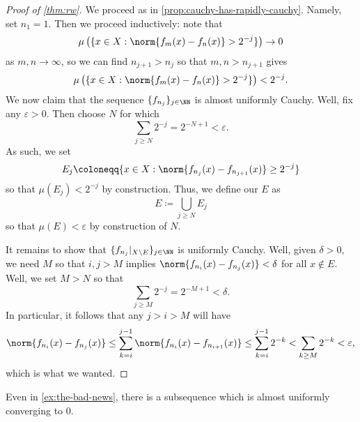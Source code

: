 \documentclass[../notes.tex]{subfiles}
\begin{document}
\begin{proof}[Proof of \autoref{thm:rw}]
	We proceed as in \autoref{prop:cauchy-has-rapidly-cauchy}. Namely, set $n_1=1$. Then we proceed inductively: note that
	\[\mu\left(\{x\in X:\norm{f_m(x)-f_n(x)}>2^{-j}\}\right)\to0\]
	as $m,n\to\infty$, so we can find $n_{j+1}>n_j$ so that $m,n>n_{j+1}$ gives
	\[\mu\left(\{x\in X:\norm{f_m(x)-f_n(x)}>2^{-j}\}\right)<2^{-j}.\]
	We now claim that the sequence $\{f_{n_j}\}_{j\in\NN}$ is almost uniformly Cauchy. Well, fix any $\varepsilon>0$. Then choose $N$ for which
	\[\sum_{j\ge N}2^{-j}=2^{-N+1}<\varepsilon.\]
	As such, we set
	\[E_j\coloneqq\{x\in X:\norm{f_{n_j}(x)-f_{n_{j+1}}(x)}\ge2^{-j}\}\]
	so that $\mu(E_j)<2^{-j}$ by construction. Thus, we define our $E$ as
	\[E\coloneqq\bigcup_{j\ge N}E_j\]
	so that $\mu(E)<\varepsilon$ by construction of $N$.

	It remains to show that $\{f_{n_j}|_{X\setminus E}\}_{j\in\NN}$ is uniformly Cauchy. Well, given $\delta>0$, we need $M$ so that $i,j>M$ implies $\norm{f_{n_i}(x)-f_{n_j}(x)}<\delta$ for all $x\notin E$. Well, we set $M>N$ so that
	\[\sum_{j\ge M}2^{-j}=2^{-M+1}<\delta.\]
	In particular, it follows that any $j>i>M$ will have
	\[\norm{f_{n_i}(x)-f_{n_j}(x)}\le\sum_{k=i}^{j-1}\norm{f_{n_i}(x)-f_{n_{i+1}}(x)}\le\sum_{k=i}^{j-1}2^{-k}<\sum_{k\ge M}2^{-k}<\varepsilon,\]
	which is what we wanted.
\end{proof}
\begin{example}
	Even in \autoref{ex:the-bad-news}, there is a subsequence which is almost uniformly converging to $0$.
\end{example}
\end{document}
